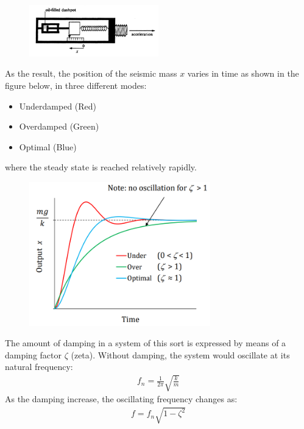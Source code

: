 \documentclass[class=report, crop=false, 12pt,a4paper]{standalone}
\begin{document}
\begin{figure}[H]
  \centering
  \includegraphics[width = 0.5\textwidth]{../img/Mdiagram31.png}
\end{figure}
As the result, the position of the seismic mass $x$ varies in time as shown in the figure below, in three different modes: 
\begin{itemize}
  \item Underdamped (Red)
  \item Overdamped (Green)
  \item Optimal (Blue)
\end{itemize}
where the steady state is reached relatively rapidly.
\begin{figure}[H]
  \centering
  \includegraphics[width = 0.7\textwidth]{../img/Mdiagram32.png}
\end{figure}
The amount of damping in a system of this sort is expressed by means of a damping factor $\zeta$ (zeta). Without damping, the system would oscillate at its natural frequency:
\begin{gather}
  f_n = \frac{1}{2\pi}\sqrt{\frac{k}{m}}
\end{gather}
As the damping increase, the oscillating frequency changes as:
\begin{gather}
  f = f_n\sqrt{1-\zeta^2}
\end{gather}
\end{document}
